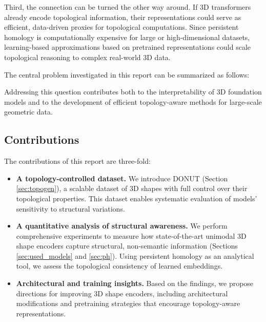 Third, the connection can be turned the other way around. If 3D transformers already encode topological information, their representations could serve as efficient, data-driven proxies for topological computations. Since persistent homology is computationally expensive for large or high-dimensional datasets, learning-based approximations based on pretrained representations could scale topological reasoning to complex real-world 3D data.

The central problem investigated in this report can be summarized as follows:

\begin{center}
\end{center}

Addressing this question contributes both to the interpretability of 3D foundation models and to the development of efficient topology-aware methods for large-scale geometric data.

\subsection{Contributions}

The contributions of this report are three-fold:

\begin{itemize}
    \item \textbf{A topology-controlled dataset.} We introduce DONUT (Section \ref{sec:topogen}), a scalable dataset of 3D shapes with full control over their topological properties. This dataset enables systematic evaluation of models’ sensitivity to structural variations.
    \item \textbf{A quantitative analysis of structural awareness.} We perform comprehensive experiments to measure how state-of-the-art unimodal 3D shape encoders capture structural, non-semantic information (Sections \ref{sec:used_models} and \ref{sec:ph}). Using persistent homology as an analytical tool, we assess the topological consistency of learned embeddings.
    \item \textbf{Architectural and training insights.} Based on the findings, we propose directions for improving 3D shape encoders, including architectural modifications and pretraining strategies that encourage topology-aware representations.
\end{itemize}